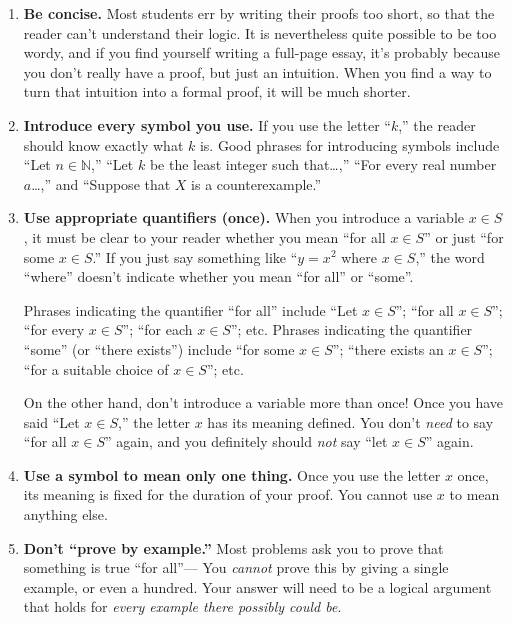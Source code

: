 \begin{enumerate}
\item \textbf{Be concise.}
        Most students err by writing their proofs too short,
        so that the reader can't understand their logic.
        It is nevertheless quite possible to be too wordy,
        and if you find yourself writing a full-page essay,
        it's probably because you don't really have a proof,
        but just an intuition.
        When you find a way to turn that intuition into a formal proof,
        it will be much shorter.

\item \textbf{Introduce every symbol you use.}
        If you use the letter ``$k$,'' the reader should know exactly what $k$ is.
        Good phrases for introducing symbols include
          ``Let $n\in \mathbb{N}$,''
          ``Let $k$ be the least integer such that\ldots,''
          ``For every real number $a$\ldots,''
          and
          ``Suppose that $X$ is a counterexample.''
          
\item \textbf{Use appropriate quantifiers (once).}
        When you introduce a variable $x\in S$, 
        it must be clear to your reader whether you mean ``for all $x\in S$''
        or just ``for some $x\in S$.''
        If you just say something like ``$y=x^2$ where $x\in S$,''
        the word ``where'' doesn't indicate whether you mean ``for all'' or ``some''.
        
        Phrases indicating the quantifier ``for all'' include 
           ``Let $x\in S$'';
           ``for all $x\in S$'';
           ``for every $x\in S$'';
           ``for each $x\in S$''; etc.
        Phrases indicating the quantifier ``some'' (or ``there exists'') include
           ``for some $x\in S$'';
           ``there exists an $x\in S$'';
           ``for a suitable choice of $x\in S$''; etc.
        
        On the other hand, don't introduce a variable more than once!
        Once you have said ``Let $x\in S$,''
        the letter $x$ has its meaning defined.
        You don't \emph{need} to say ``for all $x\in S$'' again,
        and you definitely should \emph{not} say ``let $x\in S$'' again.

\item \textbf{Use a symbol to mean only one thing.}
        Once you use the letter $x$ once,
        its meaning is fixed for the duration of your proof.
        You cannot use $x$ to mean anything else.

\item \textbf{Don't ``prove by example.''}\label{pfbyexample}
        Most problems ask you to prove that something is true ``for all''---%
        You \emph{cannot} prove this by giving a single example, or even a hundred.
        Your answer will need to be a logical argument that holds for \emph{every example there possibly could be}.
        

\end{enumerate}
